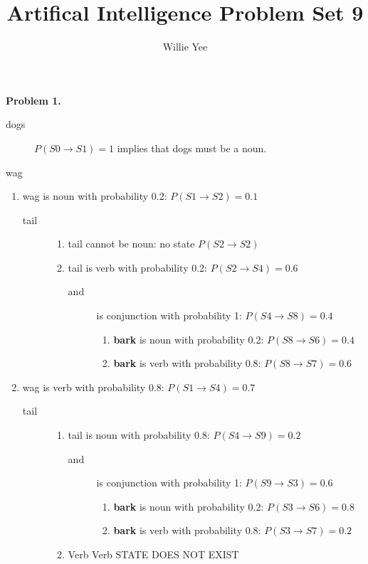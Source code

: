 \documentclass{article}
\begin{document}
\title{Artifical Intelligence Problem Set 9}
\date{}
\author{Willie Yee}
\maketitle
\noindent
\textbf{Problem 1.}
\begin{description}
	\item [dogs] $P(S0\rightarrow S1)=1$ implies that dogs must be a noun.
	\item [wag]
\end{description}
\begin{enumerate}
	\item wag is noun with probability 0.2: $P(S1\rightarrow S2)=0.1$
	\begin{description}
		\item [tail] 
		\begin{enumerate}
			\item tail cannot be noun: no state $P(S2\rightarrow S2)$
			\item tail is verb with probability 0.2: $P(S2\rightarrow S4)=0.6$
			\begin{description}
				\item [and] is conjunction with probability 1: $P(S4\rightarrow S8)=0.4$
				\begin{enumerate}
					\item \textbf{bark} is noun with probability 0.2: $P(S8\rightarrow S6)=0.4$
					\item \textbf{bark} is verb with probability 0.8: $P(S8\rightarrow S7)=0.6$
				\end{enumerate}
			\end{description}
		\end{enumerate}
	\end{description}
	\item wag is verb with probability 0.8: $P(S1\rightarrow S4)=0.7$
	\begin{description}
		\item [tail]
		\begin{enumerate}
			\item tail is noun with probability 0.8: $P(S4\rightarrow S9)=0.2$
			\begin{description}
				\item [and] is conjunction with probability 1: $P(S9\rightarrow S3)=0.6$
				\begin{enumerate}
					\item \textbf{bark} is noun with probability 0.2: $P(S3\rightarrow S6)=0.8$
					\item \textbf{bark} is verb with probability 0.8: $P(S3\rightarrow S7)=0.2$
				\end{enumerate}
			\end{description}
			\item Verb Verb STATE DOES NOT EXIST
		\end{enumerate}
	\end{description}
\end{enumerate}
\end{document}
